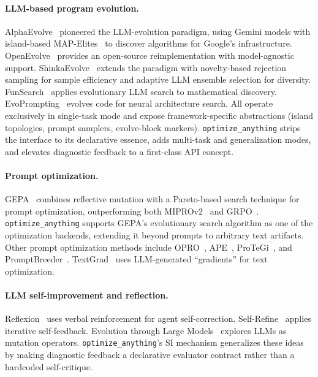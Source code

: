 \documentclass[sigconf]{acmart}
\newcommand{\oa}{\texttt{optimize\_anything}}
\newcommand{\asi}{SI}
\begin{document}
\paragraph{LLM-based program evolution.}
AlphaEvolve~\cite{alphaevolve2025} pioneered the LLM-evolution paradigm, using Gemini models with island-based MAP-Elites~\cite{mouret2015mapelites} to discover algorithms for Google's infrastructure. OpenEvolve~\cite{openevolve2025} provides an open-source reimplementation with model-agnostic support. ShinkaEvolve~\cite{shinkaevolve2025} extends the paradigm with novelty-based rejection sampling for sample efficiency and adaptive LLM ensemble selection for diversity. FunSearch~\cite{romera2024funsearch} applies evolutionary LLM search to mathematical discovery. EvoPrompting~\cite{chen2024evoprompting} evolves code for neural architecture search. All operate exclusively in single-task mode and expose framework-specific abstractions (island topologies, prompt samplers, evolve-block markers). \oa{} strips the interface to its declarative essence, adds multi-task and generalization modes, and elevates diagnostic feedback to a first-class API concept.

\paragraph{Prompt optimization.}
GEPA~\cite{agrawal2026gepa} combines reflective mutation with a Pareto-based search technique for prompt optimization, outperforming both MIPROv2~\cite{opsahl2024miprov2} and GRPO~\cite{shao2024grpo}. \oa{} supports GEPA's evolutionary search algorithm as one of the optimization backends, extending it beyond prompts to arbitrary text artifacts. Other prompt optimization methods include OPRO~\cite{yang2024opro}, APE~\cite{zhou2023ape}, ProTeGi~\cite{pryzant2023prompt}, and PromptBreeder~\cite{fernando2024promptbreeder}. TextGrad~\cite{yuksekgonul2024textgrad} uses LLM-generated ``gradients'' for text optimization.

\paragraph{LLM self-improvement and reflection.}
Reflexion~\cite{shinn2023reflexion} uses verbal reinforcement for agent self-correction. Self-Refine~\cite{madaan2023selfrefine} applies iterative self-feedback. Evolution through Large Models~\cite{lehman2022evolution} explores LLMs as mutation operators. \oa{}'s \asi{} mechanism generalizes these ideas by making diagnostic feedback a declarative evaluator contract rather than a hardcoded self-critique.
\end{document}
